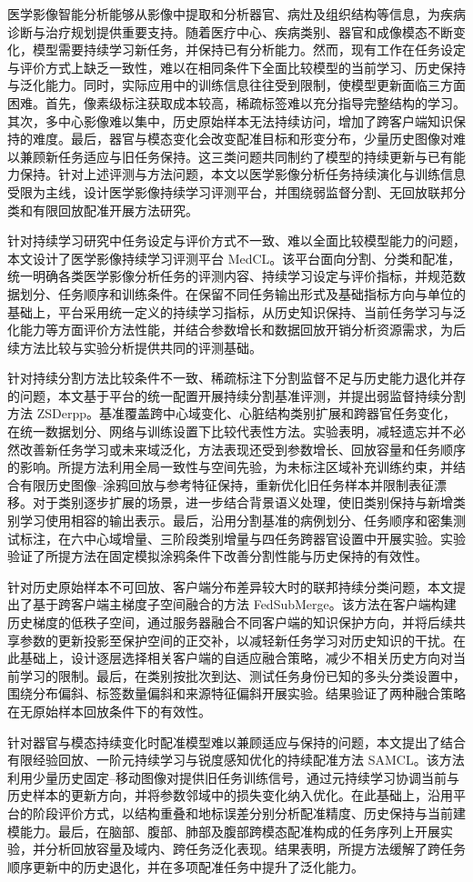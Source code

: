 医学影像智能分析能够从影像中提取和分析器官、病灶及组织结构等信息，为疾病诊断与治疗规划提供重要支持。随着医疗中心、疾病类别、器官和成像模态不断变化，模型需要持续学习新任务，并保持已有分析能力。然而，现有工作在任务设定与评价方式上缺乏一致性，难以在相同条件下全面比较模型的当前学习、历史保持与泛化能力。同时，实际应用中的训练信息往往受到限制，使模型更新面临三方面困难。首先，像素级标注获取成本较高，稀疏标签难以充分指导完整结构的学习。其次，多中心影像难以集中，历史原始样本无法持续访问，增加了跨客户端知识保持的难度。最后，器官与模态变化会改变配准目标和形变分布，少量历史图像对难以兼顾新任务适应与旧任务保持。这三类问题共同制约了模型的持续更新与已有能力保持。针对上述评测与方法问题，本文以医学影像分析任务持续演化与训练信息受限为主线，设计医学影像持续学习评测平台，并围绕弱监督分割、无回放联邦分类和有限回放配准开展方法研究。

针对持续学习研究中任务设定与评价方式不一致、难以全面比较模型能力的问题，本文设计了医学影像持续学习评测平台 MedCL。该平台面向分割、分类和配准，统一明确各类医学影像分析任务的评测内容、持续学习设定与评价指标，并规范数据划分、任务顺序和训练条件。在保留不同任务输出形式及基础指标方向与单位的基础上，平台采用统一定义的持续学习指标，从历史知识保持、当前任务学习与泛化能力等方面评价方法性能，并结合参数增长和数据回放开销分析资源需求，为后续方法比较与实验分析提供共同的评测基础。

针对持续分割方法比较条件不一致、稀疏标注下分割监督不足与历史能力退化并存的问题，本文基于平台的统一配置开展持续分割基准评测，并提出弱监督持续分割方法 ZSDerpp。基准覆盖跨中心域变化、心脏结构类别扩展和跨器官任务变化，在统一数据划分、网络与训练设置下比较代表性方法。实验表明，减轻遗忘并不必然改善新任务学习或未来域泛化，方法表现还受到参数增长、回放容量和任务顺序的影响。所提方法利用全局一致性与空间先验，为未标注区域补充训练约束，并结合有限历史图像--涂鸦回放与参考特征保持，重新优化旧任务样本并限制表征漂移。对于类别逐步扩展的场景，进一步结合背景语义处理，使旧类别保持与新增类别学习使用相容的输出表示。最后，沿用分割基准的病例划分、任务顺序和密集测试标注，在六中心域增量、三阶段类别增量与四任务跨器官设置中开展实验。实验验证了所提方法在固定模拟涂鸦条件下改善分割性能与历史保持的有效性。

针对历史原始样本不可回放、客户端分布差异较大时的联邦持续分类问题，本文提出了基于跨客户端主梯度子空间融合的方法 FedSubMerge。该方法在客户端构建历史梯度的低秩子空间，通过服务器融合不同客户端的知识保护方向，并将后续共享参数的更新投影至保护空间的正交补，以减轻新任务学习对历史知识的干扰。在此基础上，设计逐层选择相关客户端的自适应融合策略，减少不相关历史方向对当前学习的限制。最后，在类别按批次到达、测试任务身份已知的多头分类设置中，围绕分布偏斜、标签数量偏斜和来源特征偏斜开展实验。结果验证了两种融合策略在无原始样本回放条件下的有效性。

针对器官与模态持续变化时配准模型难以兼顾适应与保持的问题，本文提出了结合有限经验回放、一阶元持续学习与锐度感知优化的持续配准方法 SAMCL。该方法利用少量历史固定--移动图像对提供旧任务训练信号，通过元持续学习协调当前与历史样本的更新方向，并将参数邻域中的损失变化纳入优化。在此基础上，沿用平台的阶段评价方式，以结构重叠和地标误差分别分析配准精度、历史保持与当前建模能力。最后，在脑部、腹部、肺部及腹部跨模态配准构成的任务序列上开展实验，并分析回放容量及域内、跨任务泛化表现。结果表明，所提方法缓解了跨任务顺序更新中的历史退化，并在多项配准任务中提升了泛化能力。
